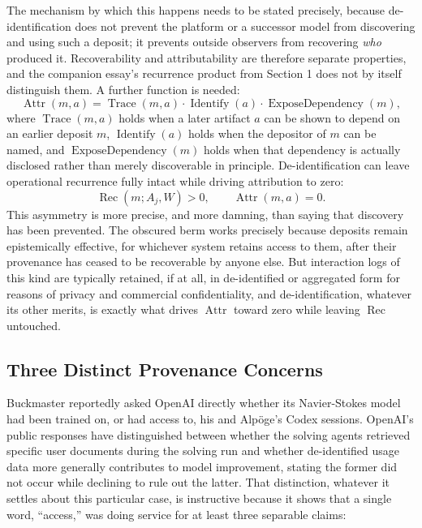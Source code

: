 \documentclass[11pt]{article}
\begin{document}
The mechanism by which this happens needs to be stated precisely, because de-identification does not prevent the platform or a successor model from discovering and using such a deposit; it prevents outside observers from recovering \emph{who} produced it. Recoverability and attributability are therefore separate properties, and the companion essay's recurrence product from Section 1 does not by itself distinguish them. A further function is needed:
\[
\operatorname{Attr}(m, a) = \operatorname{Trace}(m, a) \cdot \operatorname{Identify}(a) \cdot \operatorname{ExposeDependency}(m),
\]
where $\operatorname{Trace}(m,a)$ holds when a later artifact $a$ can be shown to depend on an earlier deposit $m$, $\operatorname{Identify}(a)$ holds when the depositor of $m$ can be named, and $\operatorname{ExposeDependency}(m)$ holds when that dependency is actually disclosed rather than merely discoverable in principle. De-identification can leave operational recurrence fully intact while driving attribution to zero:
\[
\operatorname{Rec}(m; A_j, W) > 0,
\qquad
\operatorname{Attr}(m, a) = 0.
\]
This asymmetry is more precise, and more damning, than saying that discovery has been prevented. The obscured berm works precisely because deposits remain epistemically effective, for whichever system retains access to them, after their provenance has ceased to be recoverable by anyone else. But interaction logs of this kind are typically retained, if at all, in de-identified or aggregated form for reasons of privacy and commercial confidentiality, and de-identification, whatever its other merits, is exactly what drives $\operatorname{Attr}$ toward zero while leaving $\operatorname{Rec}$ untouched.

\subsection{Three Distinct Provenance Concerns}

Buckmaster reportedly asked OpenAI directly whether its Navier-Stokes model had been trained on, or had access to, his and Alp\"{o}ge's Codex sessions. OpenAI's public responses have distinguished between whether the solving agents retrieved specific user documents during the solving run and whether de-identified usage data more generally contributes to model improvement, stating the former did not occur while declining to rule out the latter. That distinction, whatever it settles about this particular case, is instructive because it shows that a single word, ``access,'' was doing service for at least three separable claims:
\end{document}
